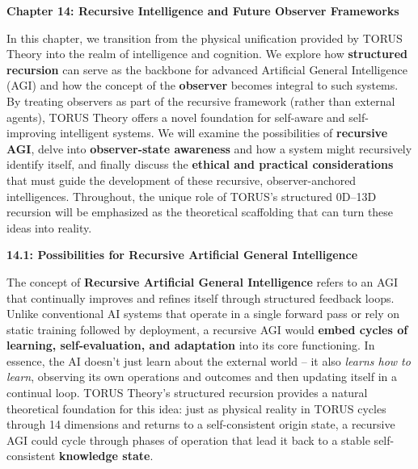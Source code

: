 \documentclass[
]{article}
\begin{document}
\textbf{Chapter 14: Recursive Intelligence and Future Observer
Frameworks}

In this chapter, we transition from the physical unification provided by
TORUS Theory into the realm of intelligence and cognition. We explore
how \textbf{structured recursion} can serve as the backbone for advanced
Artificial General Intelligence (AGI) and how the concept of the
\textbf{observer} becomes integral to such systems. By treating
observers as part of the recursive framework (rather than external
agents), TORUS Theory offers a novel foundation for self-aware and
self-improving intelligent systems. We will examine the possibilities of
\textbf{recursive AGI}, delve into \textbf{observer-state awareness} and
how a system might recursively identify itself, and finally discuss the
\textbf{ethical and practical considerations} that must guide the
development of these recursive, observer-anchored intelligences.
Throughout, the unique role of TORUS's structured 0D--13D recursion will
be emphasized as the theoretical scaffolding that can turn these ideas
into reality.

\textbf{14.1: Possibilities for Recursive Artificial General
Intelligence}

The concept of \textbf{Recursive Artificial General Intelligence} refers
to an AGI that continually improves and refines itself through
structured feedback loops. Unlike conventional AI systems that operate
in a single forward pass or rely on static training followed by
deployment, a recursive AGI would \textbf{embed cycles of learning,
self-evaluation, and adaptation} into its core functioning. In essence,
the AI doesn't just learn about the external world -- it also
\emph{learns how to learn}, observing its own operations and outcomes
and then updating itself in a continual loop. TORUS Theory's structured
recursion provides a natural theoretical foundation for this idea: just
as physical reality in TORUS cycles through 14 dimensions and returns to
a self-consistent origin state, a recursive AGI could cycle through
phases of operation that lead it back to a stable self-consistent
\textbf{knowledge state}.
\end{document}
